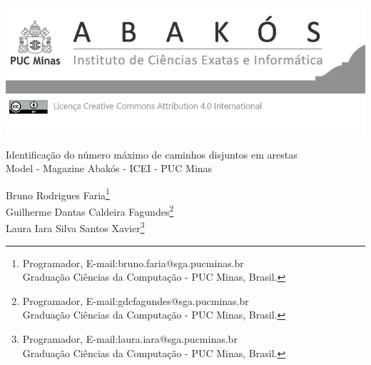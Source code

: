 \documentclass[a4paper,12pt,Times]{article}
\makeatletter
\newcommand{\monog}{Identificação do número  máximo  de  caminhos  disjuntos  em  arestas}
\newcommand{\monogES}{Model - Magazine Abakós - ICEI - PUC Minas}
\newcommand{\origem}{Brasil}
\newcommand{\AutorA}{Bruno Rodrigues Faria}
\newcommand{\funcaoA}{Programador}
\newcommand{\emailA}{bruno.faria@sga.pucminas.br}
\newcommand{\cursA}{Graduação Ciências da Computação - PUC Minas}
\newcommand{\AutorB}{Guilherme Dantas Caldeira Fagundes}
\newcommand{\funcaoB}{Programador}
\newcommand{\emailB}{gdcfagundes@sga.pucminas.br}
\newcommand{\cursB}{Graduação Ciências da Computação - PUC Minas}
\newcommand{\AutorC}{Laura Iara Silva Santos Xavier}
\newcommand{\funcaoC}{Programador}
\newcommand{\emailC}{laura.iara@sga.pucminas.br}
\newcommand{\cursC}{Graduação Ciências da Computação - PUC Minas}
\newcommand{\keyword}[1]{\textsf{#1}}
\makeatother
\begin{document}

\begin{flushleft}

\begin{minipage} [c][5cm][b]{16.5cm}
\includegraphics[scale=1.1]{figuras/pucmg.png} 
\end{minipage}

 \vspace{0cm} {
 \singlespacing \Large{\monog {} \\ }
  \normalsize{\monogES}
 }
\end{flushleft}
\begin{flushright}
\singlespacing 
\normalsize{\AutorA \footnote{\funcaoA, E-mail:\emailA \\ \cursA, \origem. }} \\
\normalsize{\AutorB \footnote{\funcaoB, E-mail:\emailB \\ \cursB, \origem. }} \\
\normalsize{\AutorC \footnote{\funcaoC, E-mail:\emailC \\ \cursC, \origem. }} \\
\end{flushright}
\thispagestyle{empty}

\begin{abstract}
\noindent
Há vários problemas a serem tratados com a descoberta do número máximo de caminhos disjuntos em arestas presentes em um grafo. O trabalho irá tratar de um método que faz a descoberta de quais são os caminhos além de mostrar os mesmos para o usuário com o intuito de auxiliar em futuros desenvolvimentos. Para isso, basta criar um grafo direcionado e falar qual a origem e destino, pois um caminho deve sair de um lugar e chegar a outro para que assim possa descobrir os caminhos disjuntos, o trabalho foi realizado na linguagem de programação Python e está disponibilizado para todos terem acesso.
\\\textbf{\keyword{Palavras-chave: }}Grafos. Arestas. Busca. Caminhos. Disjuntos. 
\end{abstract}






 \newpage
 \singlespace{
 
 
 }
\end{document}
